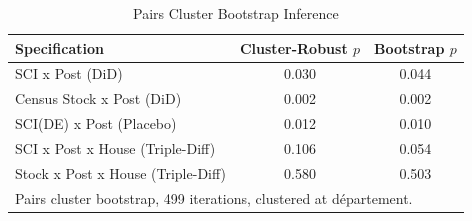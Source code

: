 \begin{table}[htbp]
\centering
\caption{Pairs Cluster Bootstrap Inference}
\label{tab:bootstrap}
\begin{tabular}{lcc}
\hline\hline
Specification & Cluster-Robust $p$ & Bootstrap $p$ \\
\hline
SCI x Post (DiD) & 0.030 & 0.044 \\
Census Stock x Post (DiD) & 0.002 & 0.002 \\
SCI(DE) x Post (Placebo) & 0.012 & 0.010 \\
SCI x Post x House (Triple-Diff) & 0.106 & 0.054 \\
Stock x Post x House (Triple-Diff) & 0.580 & 0.503 \\
\hline
\multicolumn{3}{l}{\footnotesize Pairs cluster bootstrap, 499 iterations, clustered at d\'epartement.} \\
\hline\hline
\end{tabular}
\end{table}

